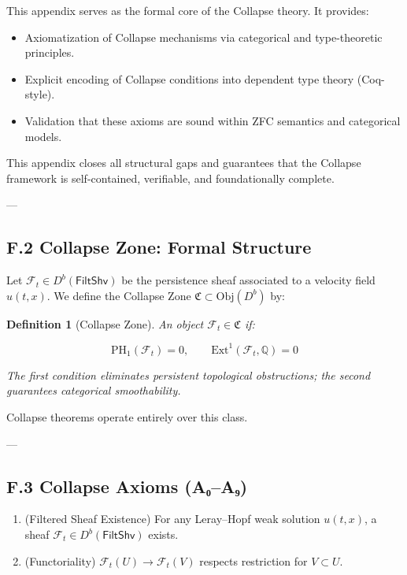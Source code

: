 \documentclass[11pt]{article}
\newtheorem{definition}[theorem]{Definition}
\begin{document}
{This appendix serves as the formal core of the Collapse theory.  
It provides:

\begin{itemize}
  \item Axiomatization of Collapse mechanisms via categorical and type-theoretic principles.
  \item Explicit encoding of Collapse conditions into dependent type theory (Coq-style).
  \item Validation that these axioms are sound within ZFC semantics and categorical models.
\end{itemize}

This appendix closes all structural gaps and guarantees that the Collapse framework is self-contained, verifiable, and foundationally complete.

---

\subsection*{F.2 Collapse Zone: Formal Structure}

Let \( \mathcal{F}_t \in D^b(\mathsf{FiltShv}) \) be the persistence sheaf associated to a velocity field \( u(t,x) \).  
We define the Collapse Zone \( \mathfrak{C} \subset \mathrm{Obj}(D^b) \) by:

\begin{definition}[Collapse Zone]
An object \( \mathcal{F}_t \in \mathfrak{C} \) if:

\[
\mathrm{PH}_1(\mathcal{F}_t) = 0, \qquad \mathrm{Ext}^1(\mathcal{F}_t, \mathbb{Q}) = 0
\]

The first condition eliminates persistent topological obstructions;  
the second guarantees categorical smoothability.
\end{definition}

Collapse theorems operate entirely over this class.

---

\subsection*{F.3 Collapse Axioms (A₀–A₉)}

\begin{enumerate}
  \item[\textbf{A₀.}] (Filtered Sheaf Existence)  
  For any Leray–Hopf weak solution \( u(t,x) \), a sheaf \( \mathcal{F}_t \in D^b(\mathsf{FiltShv}) \) exists.

  \item[\textbf{A₁.}] (Functoriality)  
  \( \mathcal{F}_t(U) \to \mathcal{F}_t(V) \) respects restriction for \( V \subset U \).


\end{enumerate}}
\end{document}
